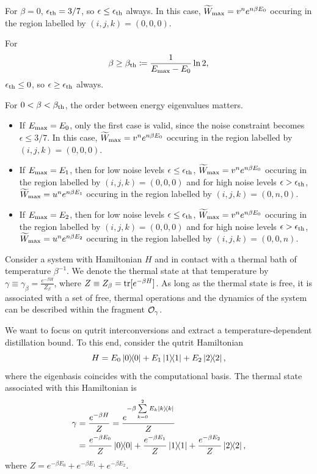 \documentclass[pra,
aps,
twocolumn,
superscriptaddress,
groupedaddress,
nofootinbib,
reprint
]{revtex4-1}
\begin{document}
For $\beta = 0$, $\epsilon_{\rm{th}} = 3/7$, so $\epsilon \leq \epsilon_{\rm{th}}$ always.
In this case, $\widetilde{W}_{\rm{max}} = \wn^n e^{n\beta E_0}$ occuring in the region labelled by $(i,j,k) = (0,0,0)$.

For 	
\begin{equation}
	\beta \geq \beta_{\rm{th}} \coloneqq \frac{1}{E_{\rm{max}} - E_0} \ln2,
\end{equation}
$\epsilon_{\rm{th}} \leq 0$, so $\epsilon \geq \epsilon_{\rm{th}}$ always.

For $0 < \beta < \beta_{\rm{th}}$, the order between energy eigenvalues matters.
\begin{itemize}
\item If $E_{\rm{max}} = E_0$, only the first case is valid, since the noise constraint becomes $\epsilon \leq 3/7$.
In this case, $\widetilde{W}_{\rm{max}} = \wn^n e^{n\beta E_0}$ occuring in the region labelled by $(i,j,k) = (0,0,0)$.
\item If $E_{\rm{max}} = E_1$, then for low noise levels $\epsilon \leq \epsilon_{\rm{th}}$, $\widetilde{W}_{\rm{max}}  = \wn^n e^{n\beta E_0}$ occuring in the region labelled by $(i,j,k) = (0,0,0)$ and for high noise levels $\epsilon > \epsilon_{\rm{th}}$, $\widetilde{W}_{\rm{max}}  = \wp^n e^{n\beta E_1}$ occuring in the region labelled by $(i,j,k) = (0,n,0)$.
\item If $E_{\rm{max}} = E_2$, then for low noise levels $\epsilon \leq \epsilon_{\rm{th}}$, $\widetilde{W}_{\rm{max}}  = \wn^n e^{n\beta E_0}$ occuring in the region labelled by $(i,j,k) = (0,0,0)$ and for high noise levels $\epsilon > \epsilon_{\rm{th}}$, $\widetilde{W}_{\rm{max}}  = \wp^n e^{n\beta E_2}$ occuring in the region labelled by $(i,j,k) = (0,0,n)$.
\end{itemize}

Consider a system with Hamiltonian $H$ and in contact with a thermal bath of temperature $\beta^{-1}$.
We denote the thermal state at that temperature by $\gamma \equiv \gamma_\beta = \frac{e^{-\beta H}}{Z_\beta}$, where $Z \equiv Z_\beta = \tr[e^{-\beta H}]$.
As long as the thermal state is free, it is associated with a set of free, thermal operations and the dynamics of the system can be described within the fragment $\O_{\gamma}$.

We want to focus on qutrit interconversions and extract a temperature-dependent distillation bound.
To this end, consider the qutrit Hamiltonian
\begin{equation}
	H = E_0 \ketbra{0} + E_1 \ketbra{1} + E_2 \ketbra{2},
\end{equation}
where the eigenbasis coincides with the computational basis.
The thermal state associated with this Hamiltonian is
\begin{align}
	\gamma &= \frac{e^{-\beta H}}{Z} = \frac{e^{-\beta \sum\limits_{k=0}^2 E_k \ketbra{k}}}{Z} \\
	&= \frac{e^{-\beta E_0}}{Z}\ketbra{0} + \frac{e^{-\beta E_1}}{Z}\ketbra{1} + \frac{e^{-\beta E_2}}{Z}\ketbra{2},
\end{align}
where $Z = e^{-\beta E_0} + e^{-\beta E_1} + e^{-\beta E_2}$.
\end{document}

